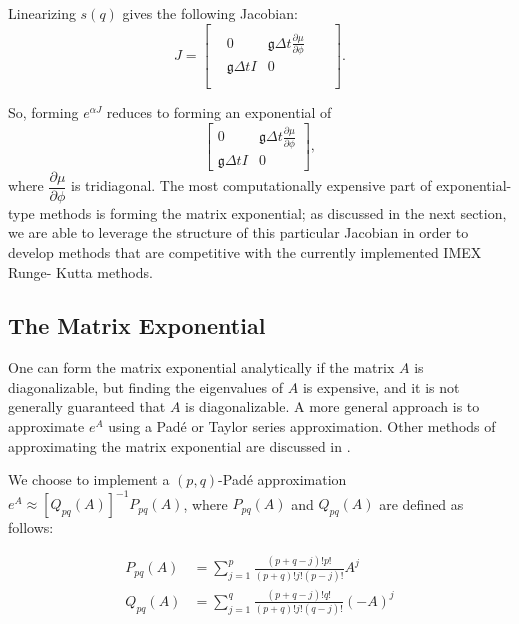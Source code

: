 \documentclass{csri19}
\newcommand{\CFKg}{\mathfrak{g}}
\begin{document}
Linearizing $s(q)$ gives the following Jacobian:
\[ J = \begin{bmatrix}
 &                  &                                                   &  & \\
 & 0                & \CFKg \Delta t \frac{\partial \mu}{\partial \phi} &  & \\
 & \CFKg \Delta t I & 0                                                 &  & \\
 &                  &                                                   &  & \\
 &                  &                                                   &  & \end{bmatrix}.\]

So, forming $e^{\alpha J}$ reduces to forming an exponential of 
\[ \begin{bmatrix}
   0              & \CFKg \Delta t \frac{\partial \mu}{\partial \phi} \\
 \CFKg \Delta t I & 0  \end{bmatrix},\]
where $\dfrac{\partial \mu}{\partial \phi}$ is tridiagonal. The most 
computationally expensive part of exponential-type methods is forming the 
matrix exponential; as discussed in the next section, we are able to 
leverage the structure of this particular Jacobian in order to develop 
methods that are competitive with the currently implemented IMEX Runge-
Kutta methods.

\subsection{The Matrix Exponential}\label{CFK:sec:matexp} 
One can form the matrix exponential analytically if the matrix $A$ is 
diagonalizable, but finding the eigenvalues of $A$ is expensive, and it is
 not generally guaranteed that $A$ is diagonalizable. A more general 
approach is to approximate $e^{A}$ using a Pad\'e or Taylor series 
approximation. Other methods of approximating the matrix exponential are 
discussed in \cite{CFK:Moler2003}.

We choose to implement a $(p,q)$-Pad\'e approximation 
$e^{A}\approx \left[Q_{pq}(A)\right]^{-1}P_{pq}(A)$, where $P_{pq}(A)$ and 
$Q_{pq}(A)$ are defined as follows:

\begin{align*}
P_{pq}(A) &= \sum_{j=1}^p\frac{(p+q-j)!p!}{(p+q)!j!(p-j)!}A^j\\
Q_{pq}(A) &= \sum_{j=1}^q\frac{(p+q-j)!q!}{(p+q)!j!(q-j)!}(-A)^j
\end{align*}
\end{document}
